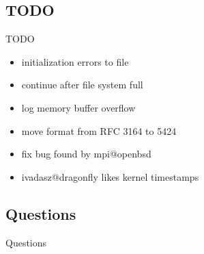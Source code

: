 \documentclass[14pt]{beamer}
\begin{document}
\subsection{TODO}
\begin{frame}{TODO}
\begin{itemize}
    \item initialization errors to file
    \item continue after file system full
    \item log memory buffer overflow
    \item move format from RFC 3164 to 5424
    \item fix bug found by mpi@openbsd
    \item ivadasz@dragonfly likes kernel timestamps
\end{itemize}
\end{frame}

\subsection{Questions}
\begin{frame}{Questions}
\begin{center}
\end{center}
\end{frame}
\end{document}
